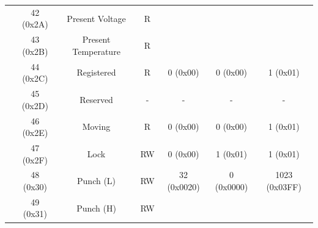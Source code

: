 \begin{table}[htbp]
\begin{adjustwidth}{-1.9cm}{-1.5cm}
\begin{tabular}{|c|c|c|c|c|c|c|}
		\multicolumn{ 1}{|c|}{} & 42 (0x2A) & Present Voltage & R &  &  &  \\ \cline{ 2- 7}
		\multicolumn{ 1}{|c|}{} & 43 (0x2B) & Present Temperature & R &  &  &  \\ \cline{ 2- 7}
		\multicolumn{ 1}{|c|}{} & 44 (0x2C) & Registered & R & 0 (0x00) & 0 (0x00) & 1 (0x01) \\ \cline{ 2- 7}
		\multicolumn{ 1}{|c|}{} & 45 (0x2D) & Reserved & - & - & - & - \\ \cline{ 2- 7}
		\multicolumn{ 1}{|c|}{} & 46 (0x2E) & Moving & R & 0 (0x00) & 0 (0x00) & 1 (0x01) \\ \cline{ 2- 7}
		\multicolumn{ 1}{|c|}{} & 47 (0x2F) & Lock & RW & 0 (0x00) & 1 (0x01) & 1 (0x01) \\ \cline{ 2- 7}
		\multicolumn{ 1}{|c|}{} & 48 (0x30) & Punch (L) & RW & \multicolumn{ 1}{c|}{32 (0x0020)} & \multicolumn{ 1}{c|}{0 (0x0000)} & \multicolumn{ 1}{c|}{1023 (0x03FF)} \\ \cline{ 2- 4}
		\multicolumn{ 1}{|c|}{} & 49 (0x31) & Punch (H) & RW & \multicolumn{ 1}{c|}{} & \multicolumn{ 1}{c|}{} & \multicolumn{ 1}{c|}{} \\ \hline
	\end{tabular}
\end{adjustwidth}
\end{table}	

